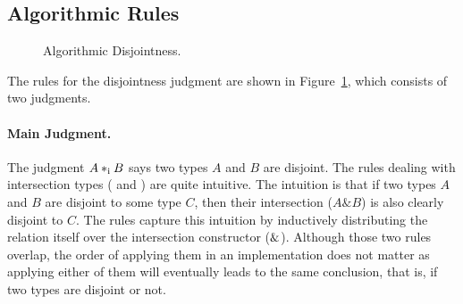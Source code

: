 \subsection{Algorithmic Rules}

\begin{figure}[t]


  \caption{Algorithmic Disjointness.}
  \label{fig:disjointness}
\end{figure}

%
%
%

The rules for the disjointness judgment are shown in
Figure~\ref{fig:disjointness}, which consists of two judgments.

\paragraph{Main Judgment.} The judgment $A *_\textnormal{i} B$ says
two types $A$ and $B$ are disjoint.
The rules dealing with intersection types ( and
) are quite intuitive. The intuition is that if two
types $A$ and $B$ are disjoint to some type $C$, then their intersection
($A\&B$) is also clearly disjoint to $C$.  The rules capture this intuition by
inductively distributing the relation itself over the intersection constructor
($\&$). Although those two rules overlap, the order of applying them in an
implementation does not matter as applying either of them will eventually leads
to the same conclusion, that is, if two types are disjoint or not.

